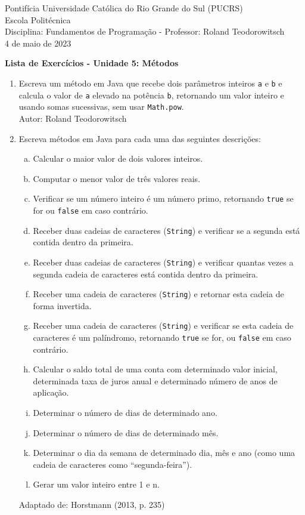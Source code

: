 \documentclass[onecolumn,a4paper,10pt]{report}
\newcommand{\+}{\, + \,}
\newcommand{\<}{\hspace*{-0.4cm}}
\begin{document}
\singlespacing

\begin{center}
Pontifícia Universidade Católica do Rio Grande do Sul (PUCRS)\\
Escola Politécnica\\
Disciplina: Fundamentos de Programação - Professor: Roland Teodorowitsch\\
4 de maio de 2023
\end{center}

\begin{center}
\textbf{Lista de Exercícios - Unidade 5: Métodos}
\end{center}

\begin{enumerate}

\item Escreva um método em Java que recebe dois parâmetros inteiros \texttt{a} e \texttt{b} e calcula o valor de \texttt{a} elevado na potência \texttt{b}, retornando um valor inteiro e usando somas sucessivas, sem usar \texttt{Math.pow}.\\
{\tiny Autor: Roland Teodorowitsch}

\item Escreva métodos em Java para cada uma das seguintes descrições:
\begin{enumerate}[a.]
	\item Calcular o maior valor de dois valores inteiros.
	\item Computar o menor valor de três valores reais.
	\item Verificar se um número inteiro é um número primo, retornando \texttt{true} se for ou \texttt{false} em caso contrário.
	\item Receber duas cadeias de caracteres (\texttt{String}) e verificar se a segunda está contida dentro da primeira.
	\item Receber duas cadeias de caracteres (\texttt{String}) e verificar quantas vezes a segunda cadeia de caracteres está contida dentro da primeira. %
	\item Receber uma cadeia de caracteres (\texttt{String}) e retornar esta cadeia de forma invertida.
	\item Receber uma cadeia de caracteres (\texttt{String}) e verificar se esta cadeia de caracteres é um palíndromo, retornando \texttt{true} se for, ou \texttt{false} em caso contrário.
	\item Calcular o saldo total de uma conta com determinado valor inicial, determinada taxa de juros anual e determinado número de anos de aplicação.
	\item Determinar o número de dias de determinado ano. %
	\item Determinar o número de dias de determinado mês. %
	\item Determinar o dia da semana de determinado dia, mês e ano (como uma cadeia de caracteres como ``segunda-feira'').
	\item Gerar um valor inteiro entre 1 e n.
\end{enumerate}
{\tiny Adaptado de: Horstmann (2013, p. 235)}


\end{enumerate}
\end{document}
